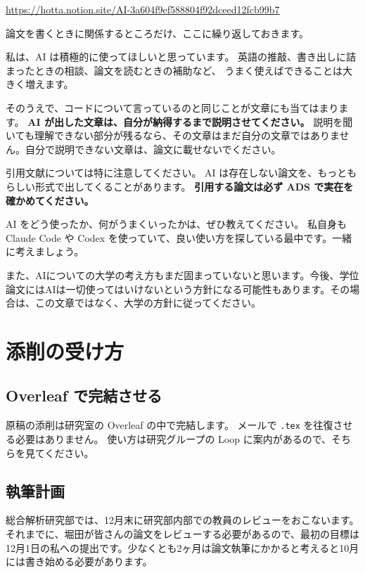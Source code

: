 \begin{center}
  \url{https://hotta.notion.site/AI-3a604f9ef588804f92dceed12fcb99b7}
\end{center}

\noindent
論文を書くときに関係するところだけ、ここに繰り返しておきます。

私は、AI は積極的に使ってほしいと思っています。
英語の推敲、書き出しに詰まったときの相談、論文を読むときの補助など、
うまく使えばできることは大きく増えます。

そのうえで、コードについて言っているのと同じことが文章にも当てはまります。
\textbf{AI が出した文章は、自分が納得するまで説明させてください。}
説明を聞いても理解できない部分が残るなら、その文章はまだ自分の文章ではありません。自分で説明できない文章は、論文に載せないでください。

引用文献については特に注意してください。
AI は存在しない論文を、もっともらしい形式で出してくることがあります。
\textbf{引用する論文は必ず ADS で実在を確かめてください。}

AI をどう使ったか、何がうまくいったかは、ぜひ教えてください。
私自身も Claude Code や Codex を使っていて、良い使い方を探している最中です。一緒に考えましょう。

また、AIについての大学の考え方もまだ固まっていないと思います。今後、学位論文にはAIは一切使ってはいけないという方針になる可能性もあります。その場合は、この文章ではなく、大学の方針に従ってください。

\section{添削の受け方}
\label{sec:guide_review}

\subsection{Overleaf で完結させる}

原稿の添削は研究室の Overleaf の中で完結します。
メールで \texttt{.tex} を往復させる必要はありません。
使い方は研究グループの Loop に案内があるので、そちらを見てください。

\subsection{執筆計画}

総合解析研究部では、12月末に研究部内部での教員のレビューをおこないます。それまでに、堀田が皆さんの論文をレビューする必要があるので、最初の目標は12月1日の私への提出です。少なくとも2ヶ月は論文執筆にかかると考えると10月には書き始める必要があります。


